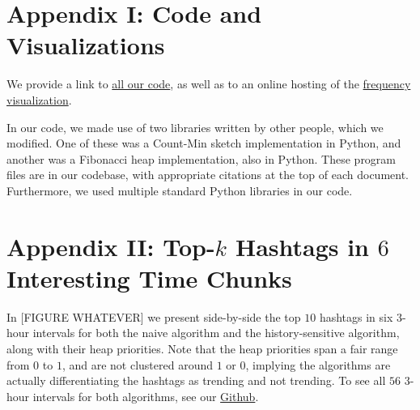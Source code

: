 \documentclass[twoside]{article}
\begin{document}
\section{Appendix I: Code and Visualizations} \label{sec:Appendix_code_viz}

We provide a link to \href{https://github.com/kiranvodrahalli/cos521/}{all our code}, as well as to an online hosting of the \href{http://www.princeton.edu/~awlee/trends.html}{frequency visualization}.

In our code, we made use of two libraries written by other people, which we modified. One of these was a Count-Min sketch implementation in Python, and another was a Fibonacci heap implementation, also in Python. These program files are in our codebase, with appropriate citations at the top of each document. Furthermore, we used multiple standard Python libraries in our code.

\section{Appendix II: Top-$k$ Hashtags in $6$ Interesting Time Chunks} \label{sec:Appendix_topk}

In [FIGURE WHATEVER] we present side-by-side the top $10$ hashtags in six $3$-hour intervals for both the naive algorithm and the history-sensitive algorithm, along with their heap priorities. Note that the heap priorities span
a fair range from $0$ to $1$, and are not clustered around $1$ or $0$, implying the algorithms are actually differentiating the hashtags as trending and not trending. To see all $56$ $3$-hour intervals for both algorithms, see our \href{https://github.com/kiranvodrahalli/cos521/}{Github}.

\end{document}
